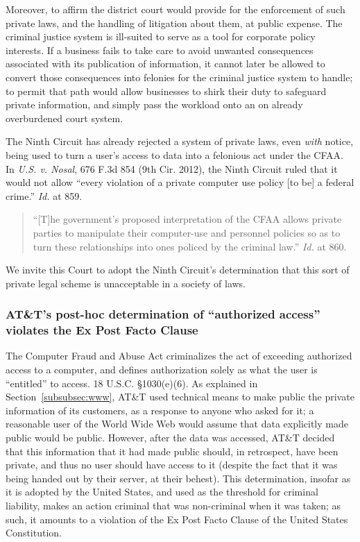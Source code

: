 \documentclass{article}
\begin{document}
	 Moreover, to affirm the district court would provide for the enforcement of such private laws, and the handling of litigation about them, at public expense.  The criminal justice system is ill-suited to serve as a tool for corporate policy interests.  If a business fails to take care to avoid unwanted consequences associated with its publication of information, it cannot later be allowed to convert those consequences into felonies for the criminal justice system to handle; to permit that path would allow businesses to shirk their duty to safeguard private information, and simply pass the workload onto an on already overburdened court system.
		
	The Ninth Circuit has already rejected a system of private laws, even \emph{with} notice, being used to turn a user's access to data into a felonious act under the CFAA. In \emph{U.S. v. Nosal}, 676 F.3d 854 (9th Cir. 2012), the Ninth Circuit ruled that it would not allow ``every violation of a private computer use policy [to be] a federal crime.'' \emph{Id.} at 859. 
	\begin{quote}
		\begin{singlespace}
			\fontsize{14}{17}\selectfont
			``[T]he government's proposed interpretation of the CFAA allows private parties to manipulate their computer-use and personnel policies so as to turn these relationships into ones policed by the criminal law.'' \emph{Id.} at 860.
		\end{singlespace}
	\end{quote}
		
		 We invite this Court to adopt the Ninth Circuit's determination that this sort of private legal scheme is unacceptable in a society of laws.
	
	\subsubsection{AT\&T's post-hoc determination of ``authorized access'' violates the Ex Post Facto Clause}
	
	The Computer Fraud and Abuse Act criminalizes the act of exceeding authorized access to a computer, and defines authorization solely as what the user is ``entitled'' to access. 18 U.S.C. \S1030(e)(6). As explained in Section~\ref{subsubsec:www}, AT\&T used technical means to make public the private information of its customers, as a response to anyone who asked for it; a reasonable user of the World Wide Web would assume that data explicitly made public would be public. However, after the data was accessed, AT\&T decided that this information that it had made public should, in retrospect, have been private, and thus no user should have access to it (despite the fact that it was being handed out by their server, at their behest). This determination, insofar as it is adopted by the United States, and used as the threshold for criminal liability, makes an action criminal that was non-criminal when it was taken; as such, it amounts to a violation of the Ex Post Facto Clause of the United States Constitution.
	
\end{document}
